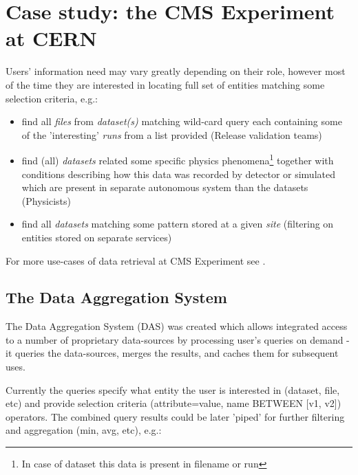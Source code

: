 \documentclass[a4paper,11pt,draft]{article}
\begin{document}
\section{Case study: the CMS Experiment at CERN}
Users' information need may vary greatly depending on their role, however most of the time they are interested in locating full set of entities matching some selection criteria, e.g.:
   \begin{itemize}
  		\item find all \textit{files} from \textit{dataset(s)} matching wild-card query each containing some of the 'interesting' \textit{runs} from a list provided (Release validation teams)
         \item find (all) \textit{datasets} related some specific physics phenomena\footnote{In case of dataset this data is present in filename or run} together with conditions describing how this data was recorded by detector or simulated which are present in separate autonomous system than the datasets (Physicists)
         \item find all \textit{datasets} matching some pattern stored at a given \textit{site} (filtering on entities stored on separate services)
   \end{itemize}                		

For more use-cases of data retrieval at CMS Experiment see \cite{CMS_data08}.


\subsection*{The Data Aggregation System}

The Data Aggregation System (DAS)\cite{Kuznetsov2010, Kuznetsov2011} was created which allows integrated access to a number of proprietary data-sources by processing user's queries on demand - it queries the data-sources, merges the results, and caches them for subsequent uses. 

Currently the queries specify what entity the user is interested in (dataset, file, etc) and provide selection criteria (attribute=value, name BETWEEN [v1, v2]) operators. The combined query results could be later 'piped' for further filtering and aggregation (min, avg, etc), e.g.:
\end{document}
